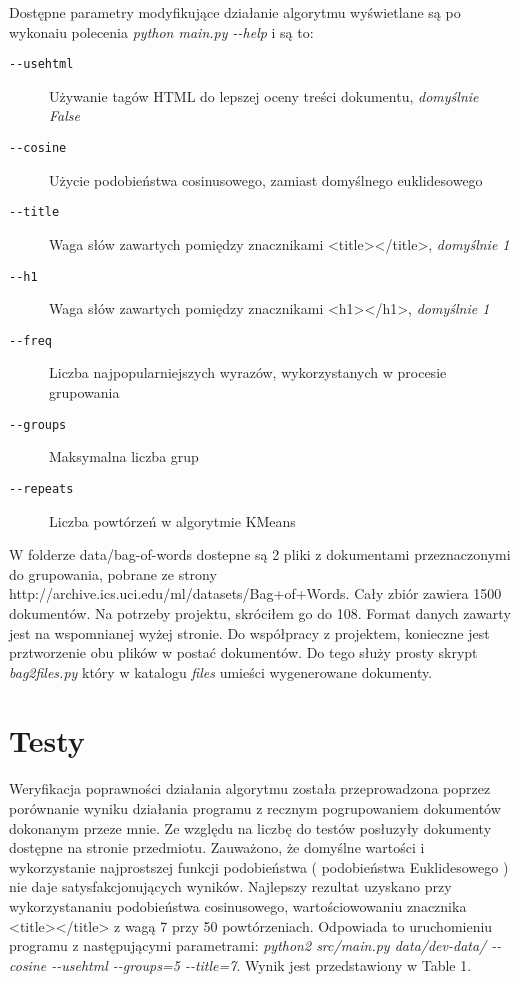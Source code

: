 \documentclass{article}
\begin{document}
Dostępne parametry modyfikujące działanie algorytmu wyświetlane są po wykonaiu polecenia \emph{python main.py -{}-help} i są to:
\begin{description}
\item [\texttt{-{}-usehtml}] Używanie tagów HTML do lepszej oceny treści dokumentu, \emph{domyślnie False}
\item [\texttt{-{}-cosine}] Użycie podobieństwa cosinusowego, zamiast domyślnego euklidesowego
\item [\texttt{-{}-title}] Waga słów zawartych pomiędzy znacznikami <title></title>, \emph{domyślnie 1}
\item [\texttt{-{}-h1}] Waga słów zawartych pomiędzy znacznikami <h1></h1>, \emph{domyślnie 1}
\item [\texttt{-{}-freq}] Liczba najpopularniejszych wyrazów, wykorzystanych w procesie grupowania
\item [\texttt{-{}-groups}] Maksymalna liczba grup
\item [\texttt{-{}-repeats}] Liczba powtórzeń w algorytmie KMeans
\end{description}

W folderze data/bag-of-words dostepne są 2 pliki z dokumentami przeznaczonymi do grupowania, pobrane ze strony http://archive.ics.uci.edu/ml/datasets/Bag+of+Words. Cały zbiór zawiera 1500 dokumentów. Na potrzeby projektu, skróciłem go do 108. Format danych zawarty jest na wspomnianej wyżej stronie. Do współpracy z projektem, konieczne jest prztworzenie obu plików w postać dokumentów. Do tego służy prosty skrypt \emph{bag2files.py} który w katalogu \emph{files} umieści wygenerowane dokumenty.

\section{Testy}
Weryfikacja poprawności działania algorytmu została przeprowadzona poprzez porównanie wyniku działania programu z recznym pogrupowaniem dokumentów dokonanym przeze mnie. Ze względu na liczbę do testów posłuzyły dokumenty dostępne na stronie przedmiotu. Zauważono, że domyślne wartości i wykorzystanie najprostszej funkcji podobieństwa ( podobieństwa Euklidesowego ) nie daje satysfakcjonujących wyników. Najlepszy rezultat uzyskano przy wykorzystananiu podobieństwa cosinusowego, wartościowowaniu znacznika <title></title> z wagą 7 przy 50 powtórzeniach. Odpowiada to uruchomieniu programu z następującymi parametrami: \emph{python2 src/main.py data/dev-data/ -{}-cosine -{}-usehtml -{}-groups=5  -{}-title=7}. Wynik jest przedstawiony w Table 1. 
\end{document}
